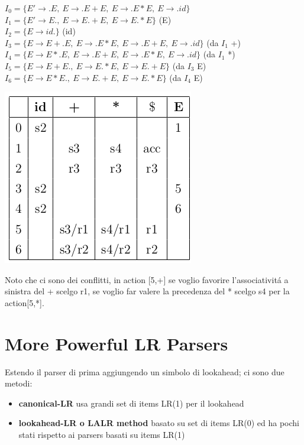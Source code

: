 $I_0 = \{ E' \rightarrow .E,\ E \rightarrow .E + E,\ E \rightarrow .E * E,\ E \rightarrow .id \}$ \\
$I_1 = \{ E' \rightarrow E.,\ E \rightarrow E. + E,\ E \rightarrow E. * E \}$ (E)\\
$I_2 = \{ E \rightarrow id. \}$ (id) \\
$I_3 = \{ E \rightarrow E +. E,\ E \rightarrow .E * E,\ E \rightarrow .E + E,\ E \rightarrow .id \}$ (da $I_1$ +) \\
$I_4 = \{ E \rightarrow E *. E,\ E \rightarrow .E + E,\ E \rightarrow .E * E,\ E \rightarrow .id \}$ (da $I_1$ *) \\
$I_5 = \{ E \rightarrow E + E.,\ E \rightarrow E. * E,\ E \rightarrow E. + E \}$ (da $I_3$ E) \\
$I_6 = \{ E \rightarrow E * E.,\ E \rightarrow E. + E,\ E \rightarrow E. * E \}$ (da $I_4$ E) \\
\begin{center}
    \includegraphics[scale=0.6]{Chapters/Img/c04_12.png}\\
\end{center}

Noto che ci sono dei conflitti, in action [5,+] se voglio favorire l'associativit\'a a sinistra del + scelgo r1, se voglio far valere la precedenza del 
* scelgo s4 per la action[5,*].

\section{More Powerful LR Parsers}
Estendo il parser di prima aggiungendo un simbolo di lookahead; ci sono due metodi:
\begin{itemize}
    \item \textbf{canonical-LR} usa grandi set di items LR(1) per il lookahead \\
    \item \textbf{lookahead-LR o LALR method} basato su set di items LR(0) ed ha pochi stati rispetto ai parsers basati su items LR(1)\\ 
\end{itemize}

